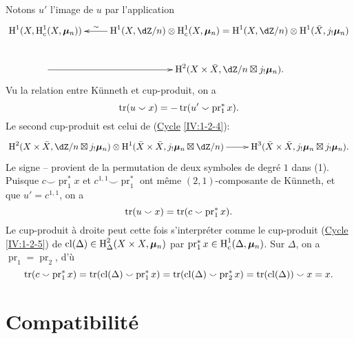 Notons $u'$ l'image de $u$ par l'application 
\[\xymatrix{
  \h^1(X,\h_c^1(X,\dmu_n)) 
    & \ar[l]_-\sim \h^1(X,\dZ/n) \otimes \h_c^1(X,\dmu_n) = \h^1(X,\dZ/n)\otimes \h^1(\bar X,j_!\dmu_n) \\
    \ar[r] 
      & \h^2(X\times \bar X,\dZ/n\boxtimes j_!\dmu_n) \text{.}
}\]
Vu la relation entre K\"unneth et cup-produit, on a 
\[
  \operatorname{tr}(u\smallsmile x) = -\operatorname{tr}(u'\smallsmile \operatorname{pr}_1^\ast x) \text{.}
\]
Le second cup-produit est celui de (\hyperref[IV]{Cycle} \ref{IV:1-2-4}):
\[\xymatrix{
  \h^2(X\times \bar X,\dZ/n\boxtimes j_!\dmu_n) \otimes \h^1(\bar X\times \bar X,j_!\dmu_n\boxtimes \dZ/n) \ar[r] 
    & \h^3(\bar X\times \bar X,j_!\dmu_n \boxtimes j_!\dmu_n) \text{.}
}\]
Le signe -- provient de la permutation de deux symboles de degr\'e $1$ dans 
(1). Puisque $c\smallsmile\operatorname{pr}_1^\ast x$ et 
$c^{1,1}\smallsmile \operatorname{pr}_1^\ast$ ont m\^eme $(2,1)$-composante de 
K\"unneth, et que $u'=c^{1,1}$, on a 
\[
  \operatorname{tr}(u\smallsmile x) = \operatorname{tr}(c\smallsmile \operatorname{pr}_1^\ast x) \text{.}
\]
Le cup-produit \`a droite peut cette fois s'interpr\'eter comme le 
cup-produit (\hyperref[IV]{Cycle} \ref{IV:1-2-5}) de 
$\operatorname{cl}(\Delta)\in \operatorname{H}_\Delta^2(X\times X,{\bm\mu}_n)$ par 
$\operatorname{pr}_1^\ast x\in \operatorname{H}_c^1(\Delta,{\bm\mu}_n)$. Sur $\Delta$, on a 
$\operatorname{pr}_1=\operatorname{pr}_2$, d'\`u 
\[
  \operatorname{tr}(c\smallsmile \operatorname{pr}_1^\ast x) = \operatorname{tr}(\operatorname{cl}(\Delta)\smallsmile \operatorname{pr}_1^\ast x) = \operatorname{tr}(\operatorname{cl}(\Delta)\smallsmile \operatorname{pr}_2^\ast x) = \operatorname{tr}(\operatorname{cl}(\Delta))\smallsmile x = x \text{.}
\]










\section{Compatibilit\'e \texorpdfstring{\cite[XVIII 3.1.10.3]{sga4}}{[SGA 4, XVIII 3.1.10.3]}}


